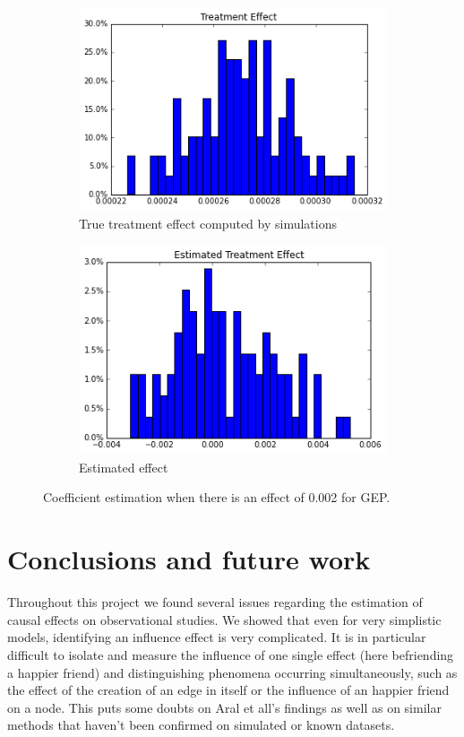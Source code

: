 \documentclass[11pt]{article}
\begin{document}
\begin{figure}[h]
\centering
\begin{subfigure}{.5\textwidth}
  \centering
  \includegraphics[width=.9\linewidth]{treatment_effect_no_influence.png}
  \caption{True treatment effect computed by simulations}
  \label{fig:sub1}
\end{subfigure}%
\begin{subfigure}{.5\textwidth}
  \centering
  \includegraphics[width=.9\linewidth]{estimated_no_influence_gep.png}
  \caption{Estimated effect}
  \label{fig:sub2}
\end{subfigure}
\caption{Coefficient estimation when there is an effect of 0.002 for GEP.}
\label{fig:small_effect_gep}
\end{figure}

\FloatBarrier
\section{Conclusions and future work}
Throughout this project we found several issues regarding the estimation of causal effects on observational studies. We showed that even for very simplistic models, identifying an influence effect is very complicated. It is in particular difficult to isolate and measure the influence of one single effect (here befriending a happier friend) and distinguishing phenomena occurring simultaneously, such as the effect of the creation of an edge in itself or the influence of an happier friend on a node. This puts some doubts on Aral et all’s findings as well as on similar methods that haven’t been confirmed on simulated or known datasets. \\
\end{document}
